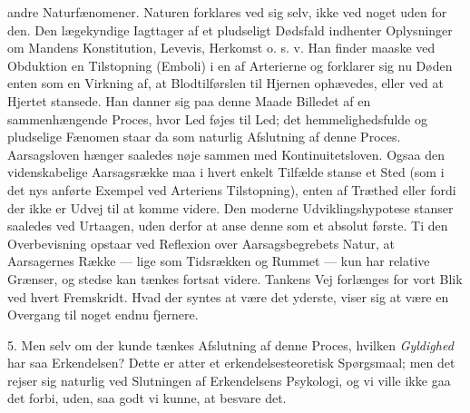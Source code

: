 \documentclass[12pt,a4paper,openany]{book}
\newcommand{\opage}[1]{\marginnote{\footnotesize\textit{[#1]}}}
\begin{document}
\opage{263}andre Naturfænomener. Naturen forklares ved sig selv, ikke
ved noget uden for den. Den lægekyndige Iagttager af et pludseligt
Dødsfald indhenter Oplysninger om Mandens Konstitution, Levevis,
Herkomst o. s. v. Han finder maaske ved Obduktion en Tilstopning
(Emboli) i en af Arterierne og forklarer sig nu Døden enten som en
Virkning af, at Blodtilførslen til Hjernen ophævedes, eller ved at
Hjertet stansede. Han danner sig paa denne Maade Billedet af en
sammenhængende Proces, hvor Led føjes til Led; det hemmelighedsfulde og
pludselige Fænomen staar da som naturlig Afslutning af denne Proces.
Aarsagsloven hænger saaledes nøje sammen med Kontinuitetsloven. Ogsaa
den videnskabelige Aarsagsrække maa i hvert enkelt Tilfælde stanse et
Sted (som i det nys anførte Exempel ved Arteriens Tilstopning), enten af
Træthed eller fordi der ikke er Udvej til at komme videre. Den moderne
Udviklingshypotese stanser saaledes ved Urtaagen, uden derfor at anse
denne som et absolut første. Ti den Overbevisning opstaar ved Reflexion
over Aarsagsbegrebets Natur, at Aarsagernes Række --- lige som
Tidsrækken og Rummet --- kun har relative Grænser, og stedse kan tænkes
fortsat videre. Tankens Vej forlænges for vort Blik ved hvert
Fremskridt. Hvad der syntes at være det yderste, viser sig at være en
Overgang til noget endnu fjernere.

5. Men selv om der kunde tænkes Afslutning af denne Proces, hvilken
\emph{Gyldighed} har saa Erkendelsen? Dette er atter et
erkendelsesteoretisk Spørgsmaal; men det rejser sig naturlig ved
Slutningen af Erkendelsens Psykologi, og vi ville ikke gaa det forbi,
uden, saa godt vi kunne, at besvare det.
\end{document}
